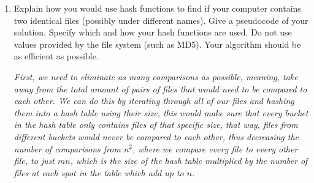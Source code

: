 \documentclass[11pt,epic,leqno,eepic,psfig,]{article}
\newcommand{\ans}[1]{{\color{brown}{\bf\Large Answer:} \sl  #1 \color{black}}}
\renewcommand{\i}{\item}
\begin{document}
\renewcommand{\i}{\item}

 
 \everymath{\color{blue}}
 

\def\polylog{{{\sl polylog }}}
\def\poly{{{\sl poly }}}





\newpage 






   
\begin{enumerate}


 
 \item Explain how you would use hash functions to find if your computer  contains two identical  files  (possibly under different names).   Give a     pseudocode of your solution.    Specify which and how your hash functions are used. Do not use  values provided by the file system (such as MD5). Your algorithm should be as efficient as possible.
 \ans{First, we need to eliminate as many comparisons as possible, meaning, take away from the total amount of pairs of files that would need to be compared to each other. We can do this by iterating through all of our files and hashing them into a hash table using their size, this would make sure that every bucket in the hash table only contains files of that specific size, that way, files from different buckets would never be compared to each other, thus decreasing the number of comparisons from $n^2$, where we compare every file to every other file, to just $mn$, which is the size of the hash table multiplied by the number of files at each spot in the table which add up to $n$.
 
}
\end{enumerate}
\end{document}
